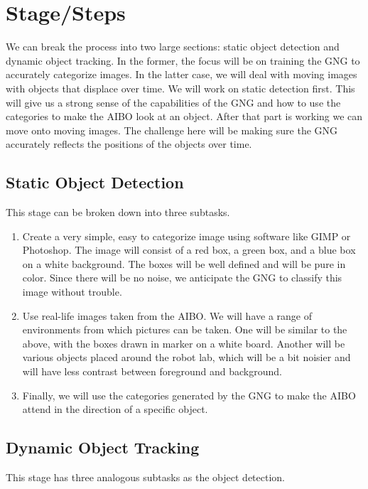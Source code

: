 \documentclass{article}
\begin{document}
\section{Stage/Steps}

We can break the process into two large sections: static object detection and dynamic object tracking. In the former, the focus will be on training the GNG to accurately categorize images. In the latter case, we will deal with moving images with objects that displace over time. We will work on static detection first. This will give us a strong sense of the capabilities of the GNG and how to use the categories to make the AIBO look at an object. After that part is working we can move onto moving images. The challenge here will be making sure the GNG accurately reflects the positions of the objects over time.

\subsection{Static Object Detection}

This stage can be broken down into three subtasks.

\begin{enumerate}
  \item Create a very simple, easy to categorize image using software like GIMP or Photoshop. The image will consist of a red box, a green box, and a blue box on a white background. The boxes will be well defined and will be pure in color. Since there will be no noise, we anticipate the GNG to classify this image without trouble.
  \item Use real-life images taken from the AIBO. We will have a range of environments from which pictures can be taken. One will be similar to the above, with the boxes drawn in marker on a white board. Another will be various objects placed around the robot lab, which will be a bit noisier and will have less contrast between foreground and background.
  \item Finally, we will use the categories generated by the GNG to make the AIBO attend in the direction of a specific object.
\end{enumerate}

\subsection{Dynamic Object Tracking}

This stage has three analogous subtasks as the object detection.
\end{document}
